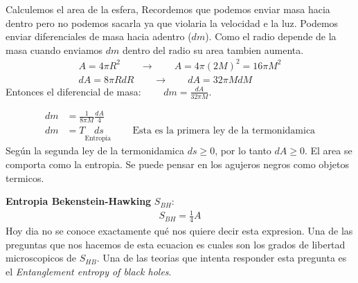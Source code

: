 \documentclass{article}
\begin{document}
\hfill

Calculemos el area de la esfera, Recordemos que podemos enviar masa hacia dentro pero no podemos sacarla ya que violaria la velocidad e la luz. Podemos enviar diferenciales de masa hacia adentro ($ dm  $). Como el radio depende de la masa cuando enviamos $ dm  $ dentro del radio su area tambien aumenta. 
\begin{gather*}
  A = 4\pi R^2 \qquad \rightarrow \qquad A = 4\pi(2M)^2 = 16 \pi M^2 \\
  dA = 8\pi R dR \qquad \rightarrow \qquad dA = 32\pi M dM
\end{gather*}
Entonces el diferencial de masa: $\qquad  dm = \displaystyle\frac{dA }{32 \pi M } $.

\begin{align*}
  dm &= \displaystyle\frac{1 }{8\pi M } \displaystyle\frac{dA }{4 }\\
  dm &= T \underset{\text{Entropia }}{ds } \qquad \text{Esta es la primera ley de la termonidamica}
\end{align*}
Según la segunda ley de la termonidamica $ ds \geq 0  $, por lo tanto  $ dA \geq 0  $. El area se comporta como la entropia. Se puede pensar en los agujeros negros como objetos termicos.

\textbf{Entropia Bekenstein-Hawking } $ S _{BH }  $:
\begin{gather*}
  S _{BH } = \displaystyle\frac{1 }{4 } A  
\end{gather*}
Hoy dia no se conoce exactamente qué nos quiere decir esta expresion. Una de las preguntas que nos hacemos de esta ecuacion es cuales son los grados de libertad microscopicos de $ S _{HB }  $. Una de las teorias que intenta responder esta pregunta es el \textit{Entanglement entropy of black holes}.
\end{document}
